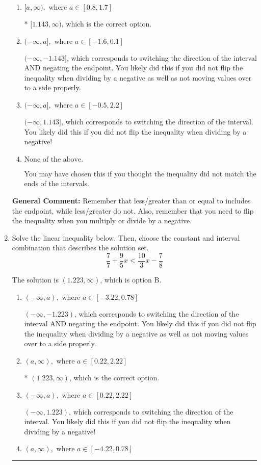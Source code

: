 \documentclass{extbook}[14pt]
\newcommand{\litem}[1]{\item #1

\rule{\textwidth}{0.4pt}}
\begin{document}
\begin{enumerate}
{\begin{enumerate}[label=\Alph*.]
 $[-1.143, \infty)$, which corresponds to negating the endpoint of the solution.
\item \( [a, \infty), \text{ where } a \in [0.8, 1.7] \)

* $[1.143, \infty)$, which is the correct option.
\item \( (-\infty, a], \text{ where } a \in [-1.6, 0.1] \)

 $(-\infty, -1.143]$, which corresponds to switching the direction of the interval AND negating the endpoint. You likely did this if you did not flip the inequality when dividing by a negative as well as not moving values over to a side properly.
\item \( (-\infty, a], \text{ where } a \in [-0.5, 2.2] \)

 $(-\infty, 1.143]$, which corresponds to switching the direction of the interval. You likely did this if you did not flip the inequality when dividing by a negative!
\item \( \text{None of the above}. \)

You may have chosen this if you thought the inequality did not match the ends of the intervals.
\end{enumerate}

\textbf{General Comment:} Remember that less/greater than or equal to includes the endpoint, while less/greater do not. Also, remember that you need to flip the inequality when you multiply or divide by a negative.
}
\litem{
Solve the linear inequality below. Then, choose the constant and interval combination that describes the solution set.
\[ \frac{7}{7} + \frac{9}{5} x < \frac{10}{3} x - \frac{7}{8} \]

The solution is \( (1.223, \infty) \), which is option B.\begin{enumerate}[label=\Alph*.]
\item \( (-\infty, a), \text{ where } a \in [-3.22, 0.78] \)

 $(-\infty, -1.223)$, which corresponds to switching the direction of the interval AND negating the endpoint. You likely did this if you did not flip the inequality when dividing by a negative as well as not moving values over to a side properly.
\item \( (a, \infty), \text{ where } a \in [0.22, 2.22] \)

* $(1.223, \infty)$, which is the correct option.
\item \( (-\infty, a), \text{ where } a \in [0.22, 2.22] \)

 $(-\infty, 1.223)$, which corresponds to switching the direction of the interval. You likely did this if you did not flip the inequality when dividing by a negative!
\item \( (a, \infty), \text{ where } a \in [-4.22, 0.78] \)


\end{enumerate}}
\end{enumerate}
\end{document}

